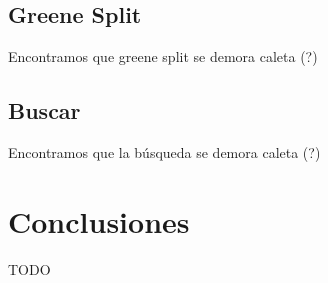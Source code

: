 \documentclass[letterpaper,10pt]{article}
\begin{document}
	\subsection{Greene Split}

	Encontramos que greene split se demora caleta (?)

	\subsection{Buscar}

	Encontramos que la búsqueda se demora caleta (?)

	\newpage

	\section{Conclusiones}

	TODO
\end{document}
